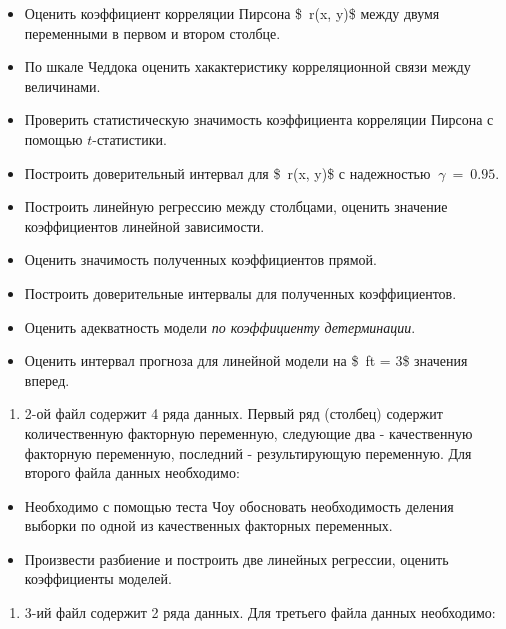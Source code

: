 \documentclass[
]{article}
\providecommand{\tightlist}{%
  \setlength{\itemsep}{0pt}\setlength{\parskip}{0pt}}
\begin{document}
\begin{itemize}
\item
  Оценить коэффициент корреляции Пирсона \$~r(x, y)\$ между двумя
  переменными в первом и втором столбце.
\item
  По шкале Чеддока оценить хакактеристику корреляционной связи между
  величинами.
\item
  Проверить статистическую значимость коэффициента корреляции Пирсона с
  помощью \(t\)-статистики.
\item
  Построить доверительный интервал для \$~r(x, y)\$ с надежностью
  \(\ \gamma\ = \ 0.95\).
\item
  Построить линейную регрессию между столбцами, оценить значение
  коэффициентов линейной зависимости.
\item
  Оценить значимость полученных коэффициентов прямой.
\item
  Построить доверительные интервалы для полученных коэффициентов.
\item
  Оценить адекватность модели \emph{по коэффициенту детерминации}.
\item
  Оценить интервал прогноза для линейной модели на \$~ft = 3\$ значения
  вперед.
\end{itemize}

\begin{enumerate}
\def\labelenumi{\arabic{enumi}.}
\setcounter{enumi}{1}
\tightlist
\item
  2-ой файл содержит 4 ряда данных. Первый ряд (столбец) содержит
  количественную факторную переменную, следующие два - качественную
  факторную переменную, последний - результирующую переменную. Для
  второго файла данных необходимо:
\end{enumerate}

\begin{itemize}
\item
  Необходимо с помощью теста Чоу обосновать необходимость деления
  выборки по одной из качественных факторных переменных.
\item
  Произвести разбиение и построить две линейных регрессии, оценить
  коэффициенты моделей.
\end{itemize}

\begin{enumerate}
\def\labelenumi{\arabic{enumi}.}
\setcounter{enumi}{2}
\tightlist
\item
  3-ий файл содержит 2 ряда данных. Для третьего файла данных
  необходимо:
\end{enumerate}
\end{document}
